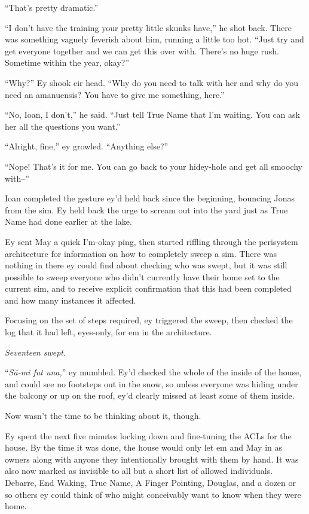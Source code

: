 ``That's pretty dramatic.''

``I don't have the training your pretty little skunks have,'' he shot back. There was something vaguely feverish about him, running a little too hot. ``Just try and get everyone together and we can get this over with. There's no huge rush. Sometime within the year, okay?''

``Why?'' Ey shook eir head. ``Why do you need to talk with her and why do you need an amanuensis? You have to give me something, here.''

``No, Ioan, I don't,'' he said. ``Just tell True Name that I'm waiting. You can ask her all the questions you want.''

``Alright, fine,'' ey growled. ``Anything else?''

``Nope! That's it for me. You can go back to your hidey-hole and get all smoochy with--''

Ioan completed the gesture ey'd held back since the beginning, bouncing Jonas from the sim. Ey held back the urge to scream out into the yard just as True Name had done earlier at the lake.

Ey sent May a quick I'm-okay ping, then started riffling through the perisystem architecture for information on how to completely sweep a sim. There was nothing in there ey could find about checking who was swept, but it was still possible to sweep everyone who didn't currently have their home set to the current sim, and to receive explicit confirmation that this had been completed and how many instances it affected.

Focusing on the set of steps required, ey triggered the sweep, then checked the log that it had left, eyes-only, for em in the architecture.

\emph{Seventeen swept.}

``\emph{Să-mi fut una,}'' ey mumbled. Ey'd checked the whole of the inside of the house, and could see no footsteps out in the snow, so unless everyone was hiding under the balcony or up on the roof, ey'd clearly missed at least some of them inside.

Now wasn't the time to be thinking about it, though.

Ey spent the next five minutes locking down and fine-tuning the ACLs for the house. By the time it was done, the house would only let em and May in as owners along with anyone they intentionally brought with them by hand. It was also now marked as invisible to all but a short list of allowed individuals. Debarre, End Waking, True Name, A Finger Pointing, Douglas, and a dozen or so others ey could think of who might conceivably want to know when they were home.

